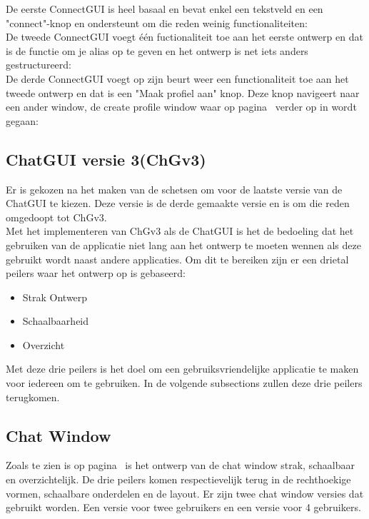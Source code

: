 \documentclass[12pt]{article}
\begin{document}
\noindent De eerste ConnectGUI is heel basaal en bevat enkel een tekstveld en een "connect"-knop en ondersteunt om die reden weinig functionaliteiten:
\\

\noindent De tweede ConnectGUI voegt \'e\'en fuctionaliteit toe aan het eerste ontwerp en dat is de functie om je alias op te geven en het ontwerp is net iets anders gestructureerd:
\\

\noindent De derde ConnectGUI voegt op zijn beurt weer een functionaliteit toe aan het tweede ontwerp en dat is een "Maak profiel aan" knop. Deze knop navigeert naar een ander window, de create profile window waar op pagina~\pageref{CPW} verder op in wordt gegaan:

\subsection{ChatGUI versie 3(ChGv3)}
\label{ChatGUI}
Er is gekozen na het maken van de schetsen om voor de laatste versie van de ChatGUI te kiezen. Deze versie is de derde gemaakte versie en is om die reden omgedoopt tot ChGv3. \\

\noindent Met het implementeren van ChGv3 als de ChatGUI is het de bedoeling dat het gebruiken van de applicatie niet lang aan het ontwerp te moeten wennen als deze gebruikt wordt naast andere applicaties. Om dit te bereiken zijn er een drietal peilers waar het ontwerp op is gebaseerd:
\begin{itemize}
\item{Strak Ontwerp}
\item{Schaalbaarheid}
\item{Overzicht}
\end{itemize}
Met deze drie peilers is het doel om een gebruiksvriendelijke applicatie te maken voor iedereen om te gebruiken. In de volgende subsections zullen deze drie peilers terugkomen.

\subsection*{Chat Window}
\label{Chat Window}
Zoals te zien is op pagina~\pageref{ChGv3Chat} is het ontwerp van de chat window strak, schaalbaar en overzichtelijk. De drie peilers komen respectievelijk terug in de rechthoekige vormen, schaalbare onderdelen en de layout. Er zijn twee chat window versies dat gebruikt worden. Een versie voor twee gebruikers en een versie voor 4 gebruikers.\\
\end{document}
